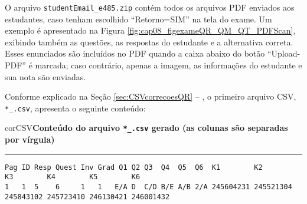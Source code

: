 O arquivo \verb|studentEmail_e485.zip| contém todos os arquivos PDF enviados aos estudantes, caso tenham escolhido ``Retorno=SIM'' na tela do exame. Um exemplo é apresentado na Figura \ref{fig:cap08_figexameQR_QM_QT_PDFScan}, exibindo também as questões, as respostas do estudante e a alternativa correta. Esses enunciados são incluídos no PDF quando a caixa abaixo do botão ``Upload-PDF'' é marcada; caso contrário, apenas a imagem, as informações do estudante e sua nota são enviadas. 


Conforme explicado na Seção \ref{sec:CSVcorrecoesQR} -- , o primeiro arquivo CSV, \verb|*_.csv|, apresenta o seguinte conteúdo:


\begin{myboxCode}{corCSV}{\textbf{Conteúdo do arquivo \texttt{*\_.csv} gerado (as colunas são separadas por vírgula)}}\vspace{3mm}
\hrule
{\scriptsize
\begin{verbatim}
Pag ID Resp Quest Inv Grad Q1 Q2 Q3  Q4  Q5  Q6  K1        K2        K3        K4        K5        K6
1   1  5    6     1   1   E/A D  C/D B/E A/B 2/A 245604231 245521304 245843102 245723410 246130421 246001432
\end{verbatim}
}
\end{myboxCode}



